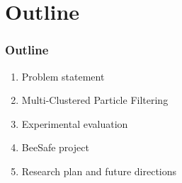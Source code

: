 \section{Outline}

\begin{frame}
	\frametitle{Outline}
	
	\begin{enumerate}
		\item Problem statement
		\item Multi-Clustered Particle Filtering
		\item Experimental evaluation
		\item BeeSafe project
		\item Research plan and future directions
	\end{enumerate}
\end{frame}
